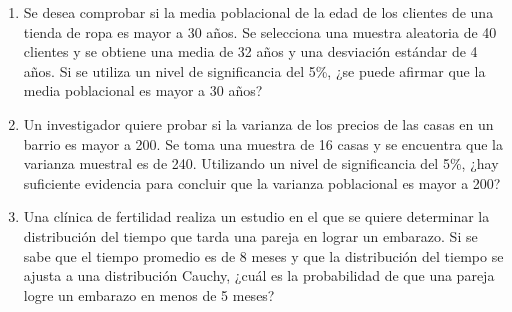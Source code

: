 \begin{Ejer}
\begin{enumerate}
    \item Se desea comprobar si la media poblacional de la edad de los clientes de una tienda de ropa es mayor a 30 años. Se selecciona una muestra aleatoria de 40 clientes y se obtiene una media de 32 años y una desviación estándar de 4 años. Si se utiliza un nivel de significancia del 5\%, ¿se puede afirmar que la media poblacional es mayor a 30 años?

    \item Un investigador quiere probar si la varianza de los precios de las casas en un barrio es mayor a 200. Se toma una muestra de 16 casas y se encuentra que la varianza muestral es de 240. Utilizando un nivel de significancia del 5\%, ¿hay suficiente evidencia para concluir que la varianza poblacional es mayor a 200?

    \item Una clínica de fertilidad realiza un estudio en el que se quiere determinar la distribución del tiempo que tarda una pareja en lograr un embarazo. Si se sabe que el tiempo promedio es de 8 meses y que la distribución del tiempo se ajusta a una distribución Cauchy, ¿cuál es la probabilidad de que una pareja logre un embarazo en menos de 5 meses?

\end{enumerate}
\end{Ejer} 


